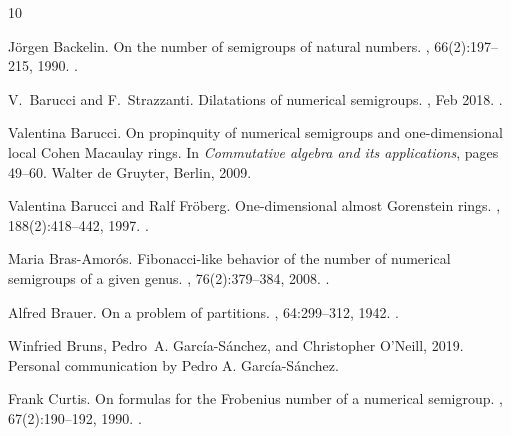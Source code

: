 \begin{thebibliography}{10}

J\"orgen Backelin.
\newblock On the number of semigroups of natural numbers.
, 66(2):197--215, 1990.
\newblock \href  {http://dx.doi.org/10.7146/math.scand.a-12304}
  {}.

V.~Barucci and F.~Strazzanti.
\newblock Dilatations of numerical semigroups.
, Feb 2018.
\newblock \href {http://dx.doi.org/10.1007/s00233-018-9922-9}
  {}.

Valentina Barucci.
\newblock On propinquity of numerical semigroups and one-dimensional local
  {C}ohen {M}acaulay rings.
\newblock In {\em Commutative algebra and its applications}, pages 49--60.
  Walter de Gruyter, Berlin, 2009.

Valentina Barucci and Ralf Fr\"{o}berg.
\newblock One-dimensional almost {G}orenstein rings.
, 188(2):418--442, 1997.
\newblock \href {http://dx.doi.org/10.1006/jabr.1996.6837}
  {}.

Maria Bras-Amor\'{o}s.
\newblock Fibonacci-like behavior of the number of numerical semigroups of a
  given genus.
, 76(2):379--384, 2008.
\newblock \href {http://dx.doi.org/10.1007/s00233-007-9014-8}
  {}.

Alfred Brauer.
\newblock On a problem of partitions.
, 64:299--312, 1942.
\newblock \href {http://dx.doi.org/10.2307/2371684} {}.

Winfried Bruns, Pedro~A. García-Sánchez, and Christopher O'Neill, 2019.
\newblock Personal communication by Pedro A. García-Sánchez.

Frank Curtis.
\newblock On formulas for the {F}robenius number of a numerical semigroup.
, 67(2):190--192, 1990.
\newblock \href {http://dx.doi.org/10.7146/math.scand.a-12330}
  {}.


\end{thebibliography}
